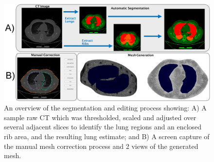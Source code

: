 \begin{figure}
\centering
\includegraphics[width=\textwidth]{chapter5-CT_to_mesh/imgs/methods_figure.pdf}
\caption{\label{fig:segment_overview}%
An overview of the segmentation and editing process showing: 
A) A sample raw CT which was thresholded, scaled and adjusted over several 
adjacent slices to identify
the lung regions and an enclosed rib area, and the resulting lung estimate; and
B) A screen  capture of the manual mesh correction process and 2 views of the generated
mesh.
}
\end{figure}